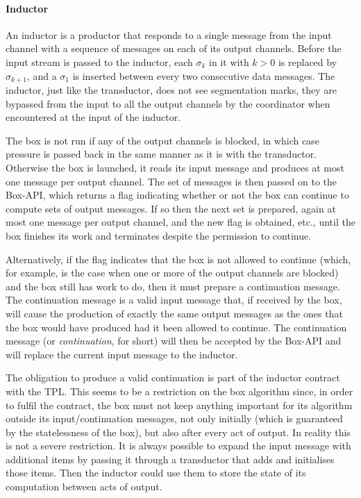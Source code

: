 \documentclass[11pt]{report}
\begin{document}
\paragraph{Inductor}
An inductor is a productor that responds to a single message from the input channel with a sequence of messages on each of its output channels.
Before the input stream is passed to the inductor, each $\sigma_k$ in it with $k>0$ is replaced by $\sigma_{k+1}$, and a $\sigma_1$ is inserted
between every two consecutive data messages.  The inductor, just like the transductor, does not see segmentation marks, they are bypassed from
the input to all the output channels by the coordinator when encountered at the input of the inductor.

The box is not run if any of the output channels is blocked, in which case pressure is passed back in the same manner as it is with the transductor. Otherwise
the box is launched, it reads its input message and produces at most one message per output channel. The set of messages is then passed on to the Box-API,
which returns a flag indicating whether or not the box can continue to compute sets of output messages. If so then the next set is prepared, again at most one message per output channel, and the new flag is obtained, etc., until the box finishes its work and terminates despite the permission to continue.

Alternatively, if the flag indicates that the box is not allowed to continue
(which, for example, is the case when one or more of the output channels are blocked) and the box still has work to do,
then it must prepare a continuation message. The continuation message is a valid input message that, if received by the box, will cause the production
of exactly the same output messages as the ones that the box would have produced had it been allowed to continue.
The continuation message (or {\it continuation}, for short) will then be accepted by the Box-API and will replace the current
input message to the inductor.

The obligation to produce a valid continuation is part of the inductor contract with the TPL. This seems to be a restriction on the box
algorithm since, in order to fulfil the contract, the box must not keep anything important for its algorithm outside its input/continuation messages, not only
initially (which is guaranteed by the statelessness of the box), but also after every act of output. In reality this is not a severe restriction.
It is always possible to expand the input message with additional items by passing it through a transductor that adds and initialises those items.
Then the inductor could use them to store the state of its computation between acts of output.
\end{document}
